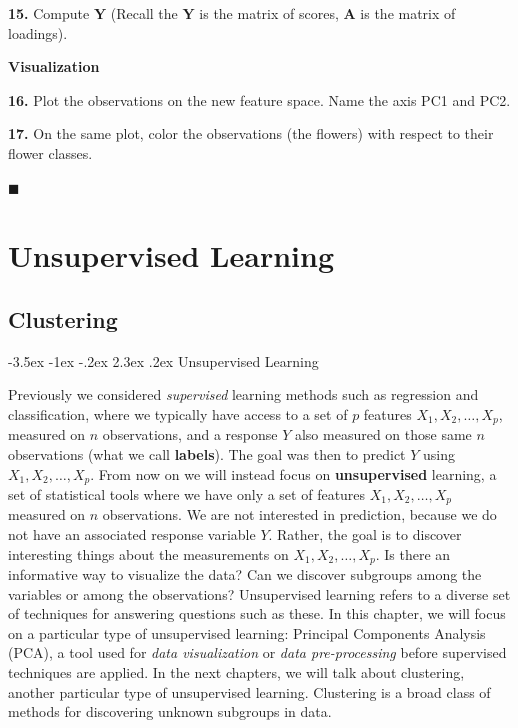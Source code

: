 \documentclass[]{book}
\makeatletter
\renewcommand\section{\@startsection {section}{1}{\z@}%
                                   {-3.5ex \@plus -1ex \@minus -.2ex}%
                                   {2.3ex \@plus.2ex}%
                                   {\normalfont\Large\bfseries\color{ForestGreen}}}
\theoremstyle{definition}
\theoremstyle{definition}
\theoremstyle{definition}
\theoremstyle{remark}
\makeatother
\begin{document}
\textbf{15.} Compute \(\mathbf{Y}\) (Recall the \(\mathbf{Y}\) is the
matrix of scores, \(\mathbf{A}\) is the matrix of loadings).

\textbf{Visualization}

\textbf{16.} Plot the observations on the new feature space. Name the
axis PC1 and PC2.

\textbf{17.} On the same plot, color the observations (the flowers) with
respect to their flower classes.

◼

\part{Unsupervised
Learning}\label{part-unsupervised-learning}

\chapter{Clustering}\label{clustering}

\section{Unsupervised Learning}\label{unsupervised-learning-1}

Previously we considered \emph{supervised} learning methods such as
regression and classification, where we typically have access to a set
of \(p\) features \(X_1,X_2,\ldots,X_p\), measured on \(n\)
observations, and a response \(Y\) also measured on those same \(n\)
observations (what we call \textbf{labels}). The goal was then to
predict \(Y\) using \(X_1,X_2,\ldots,X_p\). From now on we will instead
focus on \textbf{unsupervised} learning, a set of statistical tools
where we have only a set of features \(X_1,X_2,\ldots,X_p\) measured on
\(n\) observations. We are not interested in prediction, because we do
not have an associated response variable \(Y\). Rather, the goal is to
discover interesting things about the measurements on
\(X_1,X_2,\ldots,X_p\). Is there an informative way to visualize the
data? Can we discover subgroups among the variables or among the
observations? Unsupervised learning refers to a diverse set of
techniques for answering questions such as these. In this chapter, we
will focus on a particular type of unsupervised learning: Principal
Components Analysis (PCA), a tool used for \emph{data visualization} or
\emph{data pre-processing} before supervised techniques are applied. In
the next chapters, we will talk about clustering, another particular
type of unsupervised learning. Clustering is a broad class of methods
for discovering unknown subgroups in data.
\end{document}
